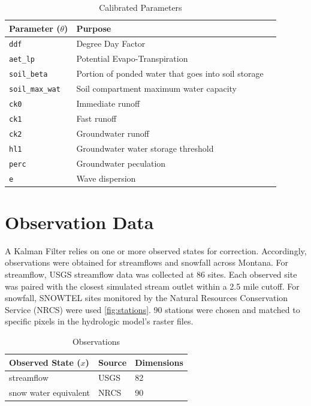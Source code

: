 \begin{table}[]
\caption{Calibrated Parameters} 
\begin{tabular}{lll}
Parameter ($\theta$) & Purpose \\ \hline
\texttt{ddf}                  & Degree Day Factor \\
\texttt{aet\_lp}              & Potential Evapo-Transpiration  \\
\texttt{soil\_beta}          & Portion of ponded water that goes into soil storage \\
\texttt{soil\_max\_wat}       & Soil compartment maximum water capacity \\
\texttt{ck0}       & Immediate runoff \\
\texttt{ck1}      & Fast runoff \\
\texttt{ck2}       & Groundwater runoff \\
\texttt{hl1}       & Groundwater water storage threshold \\
\texttt{perc}       & Groundwater peculation \\
\texttt{e}       & Wave dispersion \\
\end{tabular}
\label{tab:t_params}
\end{table}



\section{Observation Data}

A Kalman Filter relies on one or more observed states for correction. Accordingly, observations were obtained for streamflows and snowfall across Montana. For streamflow, USGS streamflow data was collected at 86 sites. Each observed site was paired with the closest simulated stream outlet within a 2.5 mile cutoff. For snowfall, SNOWTEL sites monitored by the Natural Resources Conservation Service (NRCS) were used \ref{fig:stations}. 90 stations were chosen and matched to specific pixels in the hydrologic model's raster files.


\begin{table}[]
\caption{Observations} 
\begin{tabular}{lll}
Observed State ($x$) & Source                              & Dimensions  \\ \hline
streamflow  & USGS & 82   \\
snow water equivalent         & NRCS & 90
\end{tabular}
\label{tab:obs}
\end{table}

